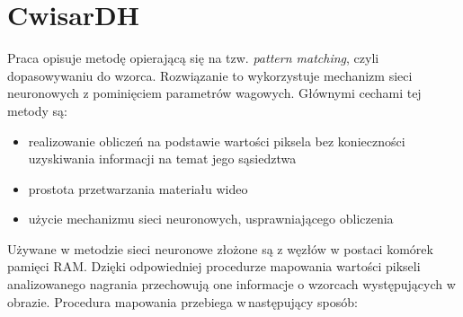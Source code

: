 \section{CwisarDH}
Praca \citep{6910014} opisuje metodę opierającą się na tzw. \textit{pattern matching}, czyli dopasowywaniu do wzorca. Rozwiązanie to wykorzystuje mechanizm sieci neuronowych z pominięciem parametrów wagowych. Głównymi cechami tej metody są:
\begin{itemize}
\item realizowanie obliczeń na podstawie wartości piksela bez konieczności uzyskiwania informacji na temat jego sąsiedztwa
\item prostota przetwarzania materiału wideo
\item użycie mechanizmu sieci neuronowych, usprawniającego obliczenia
\end{itemize}
Używane w metodzie sieci neuronowe złożone są z węzłów w postaci komórek pamięci RAM. Dzięki odpowiedniej procedurze mapowania wartości pikseli analizowanego nagrania przechowują one informacje o wzorcach występujących w obrazie. Procedura mapowania  przebiega w\,następujący sposób:
